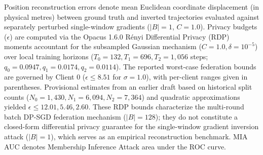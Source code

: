 \documentclass[journal]{IEEEtran}
\begin{document}
\begin{table}[!t]
\centering
\caption{Privacy Auditing Results: Deep Leakage from Gradients (DLG) and DP-SGD Moments Accounting ($\delta=10^{-5}$, $C=1.0$)}
\label{tab:privacy_audit}
\par\vspace{2pt}
\parbox{\textwidth}{\footnotesize Position reconstruction errors denote mean Euclidean coordinate displacement (in physical metres) between ground truth and inverted trajectories evaluated against separately perturbed single-window gradients ($|B|=1$, $C=1.0$). Privacy budgets ($\epsilon$) are computed via the Opacus 1.6.0 R\'{e}nyi Differential Privacy (RDP) moments accountant for the subsampled Gaussian mechanism ($C=1.0, \delta=10^{-5}$) over local training horizons ($T_0=132, T_1=696, T_2=1{,}056$ steps; $q_0=0.0947, q_1=0.0174, q_2=0.0114$). The reported worst-case federation bounds are governed by Client 0 ($\epsilon \le 8.51$ for $\sigma=1.0$), with per-client ranges given in parentheses. Provisional estimates from an earlier draft based on historical split counts ($N_0=1{,}430, N_1=6{,}094, N_2=7{,}364$) and quadratic approximations yielded $\epsilon \le 12.01, 5.46, 2.60$. These RDP bounds characterize the multi-round batch DP-SGD federation mechanism ($|B|=128$); they do not constitute a closed-form differential privacy guarantee for the single-window gradient inversion attack ($|B|=1$), which serves as an empirical reconstruction benchmark. MIA AUC denotes Membership Inference Attack area under the ROC curve.}
\end{table}
\end{document}
